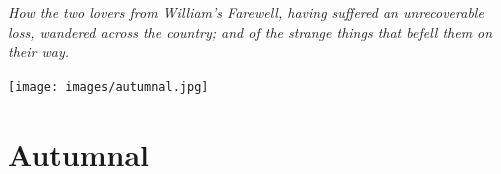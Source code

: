 \documentclass{amsbook}
\begin{document}
\thispagestyle{empty}
\vspace*{\fill}
 {\itshape How the two lovers from \emph{William's Farewell}, having suffered an unrecoverable loss, wandered across the country; and of the strange things that befell them on their way.}
\vspace*{\fill}
\clearpage

\thispagestyle{empty}
\vspace*{\fill}
{\centering
\texttt{[image: images/autumnal.jpg]}}
\vspace*{\fill}
\clearpage

\mainmatter

\chapter{Autumnal}
\end{document}
